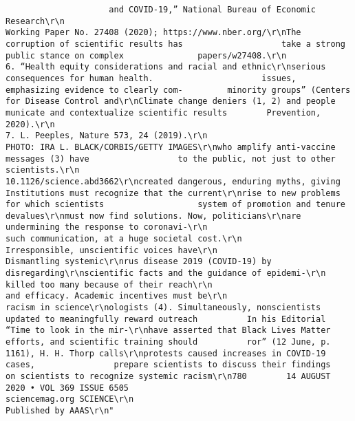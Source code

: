 \documentclass[
]{book}
\begin{document}
\begin{verbatim}
                     and COVID-19,” National Bureau of Economic Research\r\n                                                                                                                 Working Paper No. 27408 (2020); https://www.nber.org/\r\nThe corruption of scientific results has                    take a strong public stance on complex               papers/w27408.\r\n                                                                                                              6. “Health equity considerations and racial and ethnic\r\nserious consequences for human health.                      issues, emphasizing evidence to clearly com-         minority groups” (Centers for Disease Control and\r\nClimate change deniers (1, 2) and people                    municate and contextualize scientific results        Prevention, 2020).\r\n                                                                                                              7. L. Peeples, Nature 573, 24 (2019).\r\n                                                                                                                                                                             PHOTO: IRA L. BLACK/CORBIS/GETTY IMAGES\r\nwho amplify anti-vaccine messages (3) have                  to the public, not just to other scientists.\r\n                                                                                                                                           10.1126/science.abd3662\r\ncreated dangerous, enduring myths, giving                   Institutions must recognize that the current\r\nrise to new problems for which scientists                   system of promotion and tenure devalues\r\nmust now find solutions. Now, politicians\r\nare undermining the response to coronavi-\r\n                                                            such communication, at a huge societal cost.\r\n                                                               Irresponsible, unscientific voices have\r\n                                                                                                             Dismantling systemic\r\nrus disease 2019 (COVID-19) by disregarding\r\nscientific facts and the guidance of epidemi-\r\n                                                            killed too many because of their reach\r\n                                                            and efficacy. Academic incentives must be\r\n                                                                                                             racism in science\r\nologists (4). Simultaneously, nonscientists                 updated to meaningfully reward outreach          In his Editorial “Time to look in the mir-\r\nhave asserted that Black Lives Matter                       efforts, and scientific training should          ror” (12 June, p. 1161), H. H. Thorp calls\r\nprotests caused increases in COVID-19 cases,                prepare scientists to discuss their findings     on scientists to recognize systemic racism\r\n780        14 AUGUST 2020 • VOL 369 ISSUE 6505                                                                                           sciencemag.org SCIENCE\r\n                                                                           Published by AAAS\r\n"                          
\end{verbatim}
\end{document}
